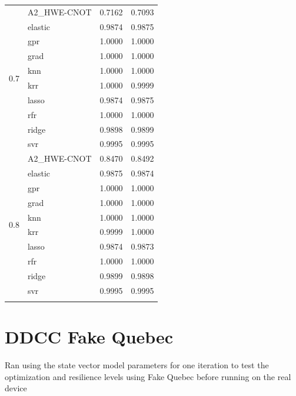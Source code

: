 \documentclass[journal=jacsat,manuscript=article]{achemso}
\begin{document}
\begin{longtable}{llrr}
	\cline{1-4}
	\multirow[t]{10}{*}{0.7} & A2{\_}HWE-CNOT & 0.7162 & 0.7093 \\
	& elastic & 0.9874 & 0.9875 \\
	& gpr & 1.0000 & 1.0000 \\
	& grad & 1.0000 & 1.0000 \\
	& knn & 1.0000 & 1.0000 \\
	& krr & 1.0000 & 0.9999 \\
	& lasso & 0.9874 & 0.9875 \\
	& rfr & 1.0000 & 1.0000 \\
	& ridge & 0.9898 & 0.9899 \\
	& svr & 0.9995 & 0.9995 \\
	\cline{1-4}
	\multirow[t]{10}{*}{0.8} & A2{\_}HWE-CNOT & 0.8470 & 0.8492 \\
	& elastic & 0.9875 & 0.9874 \\
	& gpr & 1.0000 & 1.0000 \\
	& grad & 1.0000 & 1.0000 \\
	& knn & 1.0000 & 1.0000 \\
	& krr & 0.9999 & 1.0000 \\
	& lasso & 0.9874 & 0.9873 \\
	& rfr & 1.0000 & 1.0000 \\
	& ridge & 0.9899 & 0.9898 \\
	& svr & 0.9995 & 0.9995 \\
	\cline{1-4}
	\bottomrule
	\label{table:DDCC_LC}
\end{longtable}

\section{DDCC Fake Quebec}\label{section:DDCC_fake}
Ran using the state vector model parameters for one iteration to test the optimization and resilience levels using Fake Quebec before running on the real device
\end{document}
